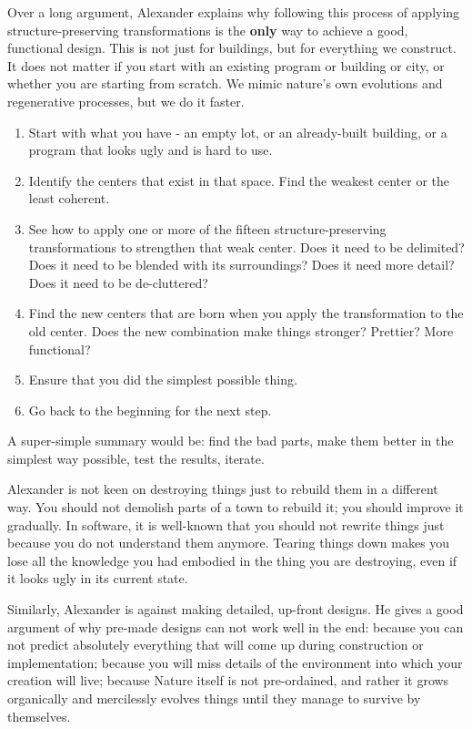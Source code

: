 Over a long argument, Alexander explains why following this process of applying structure-preserving transformations is the \textbf{only} way to achieve a good, functional design. This is not just for buildings, but for everything we construct. It does not matter if you start with an existing program or building or city, or whether you are starting from scratch. We mimic nature's own evolutions and regenerative processes, but we do it faster.
\begin{enumerate}
 \item Start with what you have - an empty lot, or an already-built building, or a program that looks ugly and is hard to use.
 \item Identify the centers that exist in that space. Find the weakest center or the least coherent.
 \item See how to apply one or more of the fifteen structure-preserving transformations to strengthen that weak center. Does it need to be delimited? Does it need to be blended with its surroundings? Does it need more detail? Does it need to be de-cluttered?
 \item Find the new centers that are born when you apply the transformation to the old center. Does the new combination make things stronger? Prettier? More functional?
 \item Ensure that you did the simplest possible thing.
 \item Go back to the beginning for the next step.
\end{enumerate}
A super-simple summary would be: find the bad parts, make them better in the simplest way possible, test the results, iterate.

Alexander is not keen on destroying things just to rebuild them in a different way.  You should  not demolish parts of a town to rebuild it; you should improve it gradually. In software, it is well-known that you should not rewrite things just because you do not understand them anymore. Tearing things down makes you lose all the knowledge you had embodied in the thing you are destroying, even if it looks ugly in its current state.

Similarly, Alexander is against making detailed, up-front designs. He gives a good argument of why pre-made designs can not work well in the end: because you can not predict absolutely everything that will come up during construction or implementation; because you will miss details of the environment into which your creation will live; because Nature itself is not pre-ordained, and rather it grows organically and mercilessly evolves things until they manage to survive by themselves.

